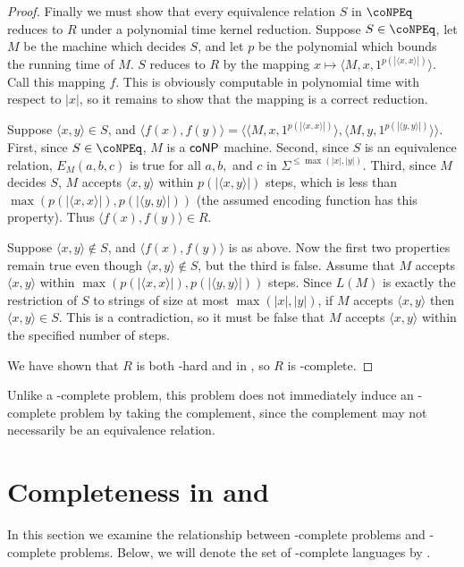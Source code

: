 \documentclass[draft]{article}
\theoremstyle{definition} \newtheorem{openproblem}[openproblem]{Open problem}
\theoremstyle{definition} \newtheorem{definition}[definition]{Definition}
\theoremstyle{remark} \newtheorem{remark}{Remark}
\newcommand{\pair}[2]{\langle#1,#2\rangle} %
\newcommand{\triple}[3]{\langle#1,#2,#3\rangle} %
\begin{document}
\begin{proof}
  Finally we must show that every equivalence relation $S$ in $\coNPEq$ reduces to $R$ under a polynomial time kernel reduction.
  Suppose $S\in\coNPEq$, let $M$ be the machine which decides $S$, and let $p$ be the polynomial which bounds the running time of $M$.
  $S$ reduces to $R$ by the mapping $x\mapsto \triple{M}{x}{1^{p(|\pair{x}{x}|)}}$.
  Call this mapping $f$.
  This is obviously computable in polynomial time with respect to $|x|$, so it remains to show that the mapping is a correct reduction.

  Suppose $\pair{x}{y}\in S$, and $\pair{f(x)}{f(y)} = \pair{\triple{M}{x}{1^{p(|\pair{x}{x}|)}}}{\triple{M}{y}{1^{p(|\pair{y}{y}|)}}}$.
  First, since $S\in\coNPEq$, $M$ is a ${\mathsf{coNP}}$ machine.
  Second, since $S$ is an equivalence relation, $E_M(a, b, c)$ is true for all $a,b,$ and $c$ in $\Sigma^{\leq\max(|x|, |y|)}$.
  Third, since $M$ decides $S$, $M$ accepts $\pair{x}{y}$ within $p(|\pair{x}{y}|)$ steps, which is less than $\max(p(|\pair{x}{x}|),p(|\pair{y}{y}|))$ (the assumed encoding function has this property).
  Thus $\pair{f(x)}{f(y)}\in R$.

  Suppose $\pair{x}{y}\notin S$, and $\pair{f(x)}{f(y)}$ is as above.
  Now the first two properties remain true even though $\pair{x}{y}\notin S$, but the third is false.
  Assume that $M$ accepts $\pair{x}{y}$ within $\max(p(|\pair{x}{x}|), p(|\pair{y}{y}|))$ steps.
  Since $L(M)$ is exactly the restriction of $S$ to strings of size at most $\max(|x|, |y|)$, if $M$ accepts $\pair{x}{y}$ then $\pair{x}{y}\in S$.
  This is a contradiction, so it must be false that $M$ accepts $\pair{x}{y}$ within the specified number of steps.

  We have shown that $R$ is both \coNPEq-hard and in \coNPEq, so $R$ is \coNPEq-complete.
\end{proof}

Unlike a \coNP-complete problem, this problem does not immediately induce an \NPEq-complete problem by taking the complement, since the complement may not necessarily be an equivalence relation.

\section{Completeness in \texorpdfstring{\NPEq}{NPEq} and \texorpdfstring{\NP}{NP}}

In this section we examine the relationship between \NP-complete problems and \NPEq-complete problems.
Below, we will denote the set of \NP-complete languages by \NPC.
\end{document}
